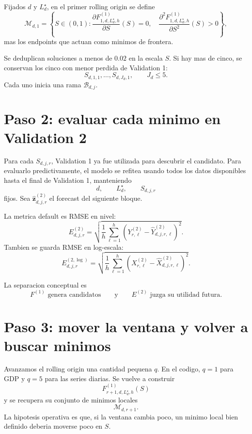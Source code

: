 \documentclass[11pt]{article}
\begin{document}
Fijados \(d\) y \(L_d^\star\), en el primer rolling origin se define
\begin{equation}
\mathcal{M}_{d,1}
=
\left\{
S\in(0,1):
\frac{\partial F^{(1)}_{1,d,L_d^\star,h}}{\partial S}(S)=0,
\quad
\frac{\partial^2 F^{(1)}_{1,d,L_d^\star,h}}{\partial S^2}(S)>0
\right\},
\label{eq:firstminima}
\end{equation}
mas los endpoints que actuan como minimos de frontera.

Se deduplican soluciones a menos de \(0.02\) en la escala \(S\). Si hay mas de
cinco, se conservan los cinco con menor perdida de Validation 1:
\[
S_{d,1,1},\ldots,S_{d,J_d,1},
\qquad
J_d\le5.
\]
Cada uno inicia una rama \(\mathcal{B}_{d,j}\).

\section{Paso 2: evaluar cada minimo en Validation 2}

Para cada \(S_{d,j,r}\), Validation 1 ya fue utilizada para descubrir el
candidato. Para evaluarlo predictivamente, el modelo se refitea usando todos
los datos disponibles hasta el final de Validation 1, manteniendo
\[
d,
\qquad
L_d^\star,
\qquad
S_{d,j,r}
\]
fijos. Sea \(\widehat{\bm z}^{(2)}_{d,j,r}\) el forecast del siguiente bloque.

La metrica default es RMSE en nivel:
\begin{equation}
E^{(2)}_{d,j,r}
=
\sqrt{
\frac{1}{h}
\sum_{\ell=1}^{h}
\left(
Y^{(2)}_{r,\ell}
-
\widehat Y^{(2)}_{d,j,r,\ell}
\right)^2
}.
\label{eq:val2level}
\end{equation}
Tambien se guarda RMSE en log-escala:
\begin{equation}
E^{(2,\log)}_{d,j,r}
=
\sqrt{
\frac{1}{h}
\sum_{\ell=1}^{h}
\left(
X^{(2)}_{r,\ell}
-
\widehat X^{(2)}_{d,j,r,\ell}
\right)^2
}.
\label{eq:val2log}
\end{equation}

La separacion conceptual es
\[
\boxed{F^{(1)}\text{ genera candidatos}}
\qquad
\text{y}
\qquad
\boxed{E^{(2)}\text{ juzga su utilidad futura}}.
\]

\section{Paso 3: mover la ventana y volver a buscar minimos}

Avanzamos el rolling origin una cantidad pequena \(q\). En el codigo,
\(q=1\) para GDP y \(q=5\) para las series diarias. Se vuelve a construir
\[
F^{(1)}_{r+1,d,L_d^\star,h}(S)
\]
y se recupera su conjunto de minimos locales
\[
\mathcal{M}_{d,r+1}.
\]
La hipotesis operativa es que, si la ventana cambia poco, un minimo local bien
definido deberia moverse poco en \(S\).
\end{document}
